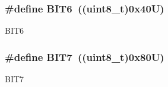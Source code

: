 \subsubsection[{\texorpdfstring{B\+I\+T6}{BIT6}}]{\setlength{\rightskip}{0pt plus 5cm}\#define B\+I\+T6~((uint8\+\_\+t)0x40\+U)}\hypertarget{group_____bits___masks_gacc2d074401e2b6322ee8f03476c24677}{}\label{group_____bits___masks_gacc2d074401e2b6322ee8f03476c24677}
B\+I\+T6 
\subsubsection[{\texorpdfstring{B\+I\+T7}{BIT7}}]{\setlength{\rightskip}{0pt plus 5cm}\#define B\+I\+T7~((uint8\+\_\+t)0x80\+U)}\hypertarget{group_____bits___masks_gaa6b8f3261ae9e2e1043380c192f7b5f0}{}\label{group_____bits___masks_gaa6b8f3261ae9e2e1043380c192f7b5f0}
B\+I\+T7 